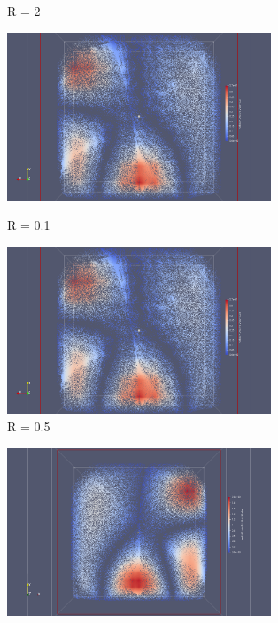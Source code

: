 \documentclass[a4paper,12pt,titlepage]{report}
\begin{document}
\begin{onehalfspace}
\begin{figure}[!h]
\begin{minipage}[c]{.46\linewidth}
        \caption{R = 2}
    \end{minipage}
\end{figure}
\begin{figure}[!h]
    \begin{minipage}[c]{.46\linewidth}
        \centering
        \includegraphics[height = 5cm, keepaspectratio]{graphes/Paraview/section_pioncarre_R_01.png}
        \caption{R = 0.1}
    \end{minipage}
    \hfill%
    \begin{minipage}[c]{.46\linewidth}
        \centering
        \includegraphics[height = 5cm, keepaspectratio]{graphes/Paraview/section_pioncarre_R_01.png}
        \caption{R = 0.5}
    \end{minipage}
\end{figure}
\begin{figure}[!h]
    \begin{minipage}[c]{.46\linewidth}
        \centering
        \includegraphics[height = 5cm, keepaspectratio]{graphes/Paraview/section_pioncarre_R_001_double.png}

\end{minipage}
\end{figure}
\end{onehalfspace}
\end{document}
